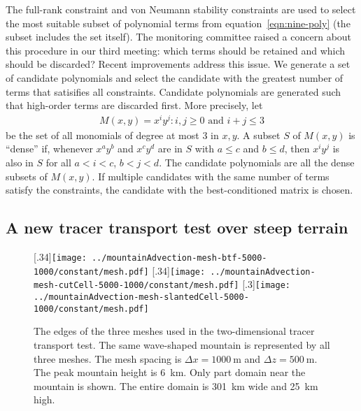 \documentclass[a4paper,11pt]{article}
\begin{document}
The full-rank constraint and von Neumann stability constraints are used to select the most suitable subset of polynomial terms from equation~\eqref{eqn:nine-poly} (the subset includes the set itself).
The monitoring committee raised a concern about this procedure in our third meeting: which terms should be retained and which should be discarded?  Recent improvements address this issue.  We generate a set of candidate polynomials and select the candidate with the greatest number of terms that satisifies all constraints.  Candidate polynomials are generated such that high-order terms are discarded first.  More precisely, let
\begin{align}
	M(x, y) = { x^i y^j : i,j \geq 0 \text{ and } i+j \leq 3 }
\end{align}
be the set of all monomials of degree at most \num{3} in $x, y$.
A subset $S$ of $M(x,y)$ is ``dense'' if, whenever $x^a y^b$ and $x^c y^d$ are in $S$ with $a \leq c$ and $b \leq d$, then $x^i y^j$ is also in $S$ for all $a < i < c$, $b < j < d$.  The candidate polynomials are all the dense subsets of $M(x,y)$.  If multiple candidates with the same number of terms satisfy the constraints, the candidate with the best-conditioned matrix is chosen.

\subsection*{A new tracer transport test over steep terrain}

\begin{figure}
	\centering
	[.34\linewidth]{\texttt{[image: ../mountainAdvection-mesh-btf-5000-1000/constant/mesh.pdf]}}
	[.34\linewidth]{\texttt{[image: ../mountainAdvection-mesh-cutCell-5000-1000/constant/mesh.pdf]}}
	[.3\linewidth]{\texttt{[image: ../mountainAdvection-mesh-slantedCell-5000-1000/constant/mesh.pdf]}}
	\caption{The edges of the three meshes used in the two-dimensional tracer transport test.  The same wave-shaped mountain is represented by all three meshes.  The mesh spacing is $\Delta x = \SI{1000}{\meter}$ and $\Delta z = \SI{500}{\meter}$.  The peak mountain height is \SI{6}{\kilo\meter}.  Only part domain near the mountain is shown.  The entire domain is \SI{301}{\kilo\meter} wide and \SI{25}{\kilo\meter} high.}
	\label{fig:meshes}
\end{figure}
\end{document}
